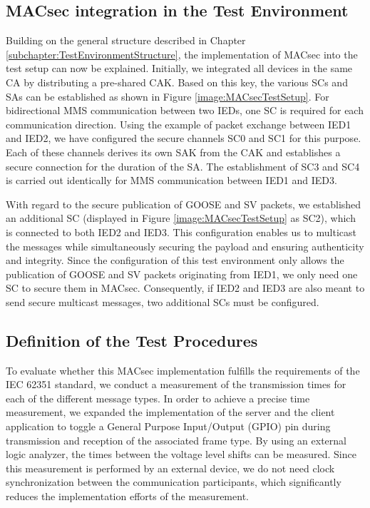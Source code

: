 \documentclass[conference, onecolumn, a4paper]{IEEEtran}
\begin{document}
\subsection{MACsec integration in the Test Environment}
\label{subchapter:TestEnvironmentMACsec}
\noindent Building on the general structure described in Chapter \ref{subchapter:TestEnvironmentStructure}, the implementation of MACsec into the test 
setup can now be explained. Initially, we integrated all devices in the same CA by distributing a pre-shared CAK. Based on this key, the various SCs and 
SAs can be established as shown in Figure \ref{image:MACsecTestSetup}. For bidirectional MMS communication between two IEDs, one SC is required for each 
communication direction. Using the example of packet exchange between IED1 and IED2, we have configured the secure channels SC0 and SC1 for this purpose. 
Each of these channels derives its own SAK from the CAK and establishes a secure connection for the duration of the SA. The establishment of SC3 and SC4 
is carried out identically for MMS communication between IED1 and IED3.

\smallskip
With regard to the secure publication of GOOSE and SV packets, we established an additional SC (displayed in Figure \ref{image:MACsecTestSetup} as SC2), 
which is connected to both IED2 and IED3. This configuration enables us to multicast the messages while simultaneously securing the payload and ensuring 
authenticity and integrity. Since the configuration of this test environment only allows the publication of GOOSE and SV packets originating from IED1, we 
only need one SC to secure them in MACsec. Consequently, if IED2 and IED3 are also meant to send secure multicast messages, two additional SCs must be 
configured.   

\subsection{Definition of the Test Procedures}
\label{subchapter:TestProcedures}
\noindent To evaluate whether this MACsec implementation fulfills the requirements of the IEC 62351 standard, we conduct a measurement of the 
transmission times for each of the different message types. In order to achieve a precise time measurement, we expanded the implementation of the server 
and the client application to toggle a General Purpose Input/Output (GPIO) pin during transmission and reception of the associated frame type. 
By using an external logic analyzer, the times between the voltage level shifts can be measured. Since this measurement is performed by an external device, 
we do not need clock synchronization between the communication participants, which significantly reduces the implementation efforts of the measurement. 
\end{document}
